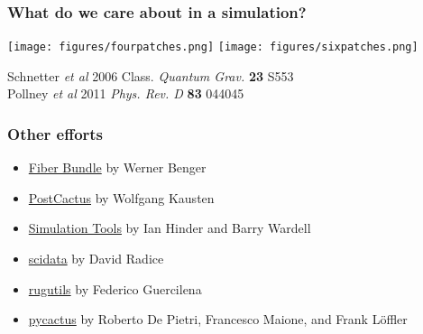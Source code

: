 \documentclass[]{beamer}
\begin{document}
\begin{frame}
  \frametitle{What do we care about in a simulation?}
    \begin{center}
    \texttt{[image: figures/fourpatches.png]}
    \texttt{[image: figures/sixpatches.png]}
  \end{center}
  Schnetter \textit{et al} 2006 Class. \textit{Quantum Grav.} \textbf{23} S553\\
  Pollney \textit{et al} 2011 \textit{Phys. Rev. D} \textbf{83} 044045
\end{frame}

\begin{frame}
  \frametitle{Other efforts}
  \begin{itemize}
  \item {\color{blue}\href{http://vish.fiberbundle.net/documentation/the-fiber-bundle-data-model/}{Fiber Bundle}} by Werner Benger
  \item {\color{blue}\href{https://bitbucket.org/DrWhat/pycactuset}{PostCactus}} by Wolfgang Kausten
  \item {\color{blue}\href{http://simulationtools.org/}{Simulation Tools}} by Ian Hinder and Barry Wardell
  \item {\color{blue}\href{https://bitbucket.org/dradice/scidata}{scidata}} by David Radice
  \item {\color{blue}\href{https://bitbucket.org/fguercilena/rugutils}{rugutils}} by Federico Guercilena
  \item {\color{blue}\href{https://bitbucket.org/knarrff/pycactus}{pycactus}} by Roberto De Pietri, Francesco Maione, and Frank L\"{o}ffler
  \end{itemize}
\end{frame}
\end{document}
